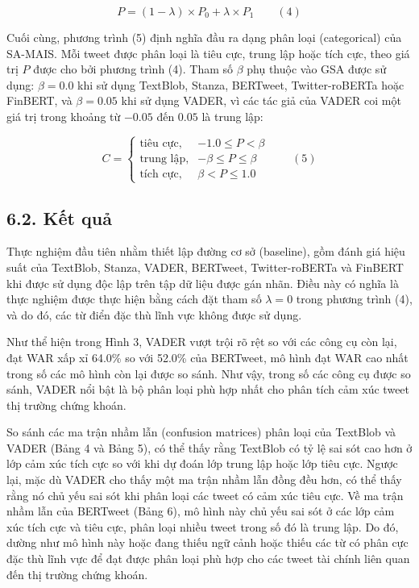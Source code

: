 \[
P = (1 - \lambda) \times P_0 + \lambda \times P_1 \qquad (4)
\]

Cuối cùng, phương trình (5) định nghĩa đầu ra dạng phân loại (categorical) của SA-MAIS. Mỗi tweet được phân loại là tiêu cực, trung lập hoặc tích cực, theo giá trị $P$ được cho bởi phương trình (4). Tham số $\beta$ phụ thuộc vào GSA được sử dụng: $\beta = 0.0$ khi sử dụng TextBlob, Stanza, BERTweet, Twitter-roBERTa hoặc FinBERT, và $\beta = 0.05$ khi sử dụng VADER, vì các tác giả của VADER coi một giá trị trong khoảng từ $-0.05$ đến $0.05$ là trung lập:

\[
C =
\begin{cases}
\text{tiêu cực}, & -1.0 \leq P < \beta \\
\text{trung lập}, & -\beta \leq P \leq \beta \\
\text{tích cực}, & \beta < P \leq 1.0
\end{cases}
\qquad (5)
\]

\subsection*{6.2. Kết quả}

Thực nghiệm đầu tiên nhằm thiết lập đường cơ sở (baseline), gồm đánh giá hiệu suất của TextBlob, Stanza, VADER, BERTweet, Twitter-roBERTa và FinBERT khi được sử dụng độc lập trên tập dữ liệu được gán nhãn. Điều này có nghĩa là thực nghiệm được thực hiện bằng cách đặt tham số $\lambda = 0$ trong phương trình (4), và do đó, các từ điển đặc thù lĩnh vực không được sử dụng.

Như thể hiện trong Hình 3, VADER vượt trội rõ rệt so với các công cụ còn lại, đạt WAR xấp xỉ 64.0\% so với 52.0\% của BERTweet, mô hình đạt WAR cao nhất trong số các mô hình còn lại được so sánh. Như vậy, trong số các công cụ được so sánh, VADER nổi bật là bộ phân loại phù hợp nhất cho phân tích cảm xúc tweet thị trường chứng khoán.

So sánh các ma trận nhầm lẫn (confusion matrices) phân loại của TextBlob và VADER (Bảng 4 và Bảng 5), có thể thấy rằng TextBlob có tỷ lệ sai sót cao hơn ở lớp cảm xúc tích cực so với khi dự đoán lớp trung lập hoặc lớp tiêu cực. Ngược lại, mặc dù VADER cho thấy một ma trận nhầm lẫn đồng đều hơn, có thể thấy rằng nó chủ yếu sai sót khi phân loại các tweet có cảm xúc tiêu cực. Về ma trận nhầm lẫn của BERTweet (Bảng 6), mô hình này chủ yếu sai sót ở các lớp cảm xúc tích cực và tiêu cực, phân loại nhiều tweet trong số đó là trung lập. Do đó, dường như mô hình này hoặc đang thiếu ngữ cảnh hoặc thiếu các từ có phân cực đặc thù lĩnh vực để đạt được phân loại phù hợp cho các tweet tài chính liên quan đến thị trường chứng khoán.

